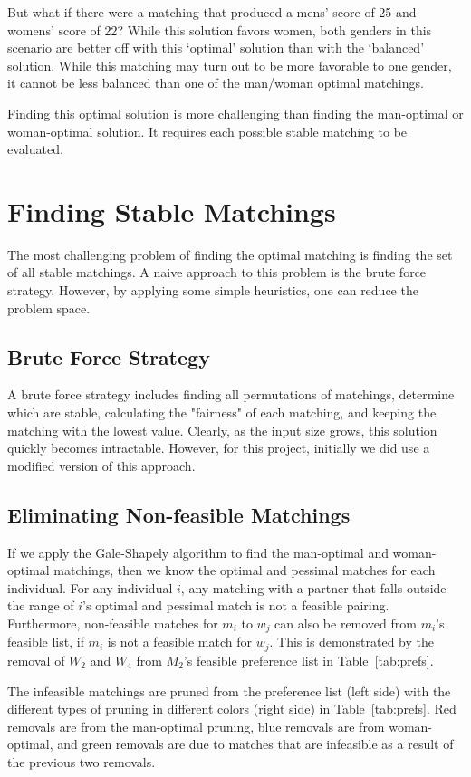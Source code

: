 \documentclass[a4paper]{article}
\begin{document}
But what if there were a matching that produced a mens' score of 25 and womens' score of 22? While this solution favors women, both genders in this scenario are better off with this `optimal' solution than with the `balanced' solution. While this matching may turn out to be more favorable to one gender, it cannot be less balanced than one of the man/woman optimal matchings.

Finding this optimal solution is more challenging than finding the man-optimal or woman-optimal solution. It requires each possible stable matching to be evaluated.

\section{Finding Stable Matchings}

The most challenging problem of finding the optimal matching is finding the set of all stable matchings. A naive approach to this problem is the brute force strategy. However, by applying some simple heuristics, one can reduce the problem space.

\subsection{Brute Force Strategy}

A brute force strategy includes finding all permutations of matchings, determine which are stable, calculating the "fairness" of each matching, and keeping the matching with the lowest value. Clearly, as the input size grows, this solution quickly becomes intractable. However, for this project, initially we did use a modified version of this approach.

\subsection{Eliminating Non-feasible Matchings}
If we apply the Gale-Shapely algorithm to find the man-optimal and woman-optimal matchings, then we know the optimal and pessimal matches for each individual. For any individual $i$, any matching with a partner that falls outside the range of $i$'s optimal and pessimal match is not a feasible pairing.  Furthermore, non-feasible matches for $m_i$ to $w_j$ can also be removed from $m_i$'s feasible list, if $m_i$ is not a feasible match for $w_j$.  This is demonstrated by the removal of $W_2$ and $W_4$ from $M_2$'s feasible preference list in Table~\ref{tab:prefs}.


The infeasible matchings are pruned from the preference list (left side) with the different types of pruning in different colors (right side) in Table~\ref{tab:prefs}.  
Red removals are from the man-optimal pruning, blue removals are from woman-optimal, and green removals are due to matches that are infeasible as a result of the previous two removals.
\end{document}
